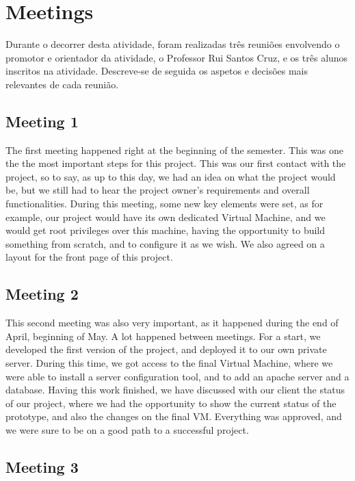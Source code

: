 \documentclass[a4paper,12pt,journal,twoside,compsoc]{PPIEEEtran}
\begin{document}

\section{Meetings}

Durante o decorrer desta atividade, foram realizadas três reuniões envolvendo o promotor e orientador da atividade, o Professor Rui Santos Cruz, e os três alunos inscritos na atividade. Descreve-se de seguida os aspetos e decisões mais relevantes de cada reunião.

\subsection{Meeting 1}

The first meeting happened right at the beginning of the semester. This was one the the most important steps for this project. This was our first contact with the project, so to say, as up to this day, we had an idea on what the project would be, but we still had to hear the project owner's requirements and overall functionalities. During this meeting, some new key elements were set, as for example, our project would have its own dedicated Virtual Machine, and we would get root privileges over this machine, having the opportunity to build something from scratch, and to configure it as we wish.
	We also agreed on a layout for the front page of this project.
	
\subsection{Meeting 2}

This second meeting was also very important, as it happened during the end of April, beginning of May. A lot happened between meetings. For a start, we developed the first version of the project, and deployed it to our own private server. During this time, we got access to the final Virtual Machine, where we were able to install a server configuration tool, and to add an apache server and a database.
Having this work finished, we have discussed with our client the status of our project, where we had the opportunity to show the current status of the prototype, and also the changes on the final VM. Everything was approved, and we were sure to be on a good path to a successful project.

\subsection{Meeting 3}
\end{document}
